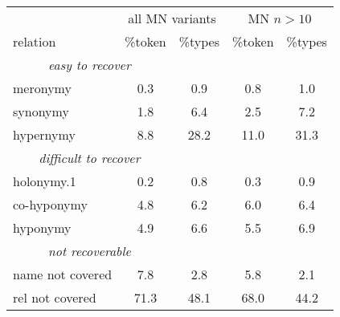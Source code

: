 \begin{table}
\small
\begin{tabular}{lcc|cc}
\toprule
 & \multicolumn{2}{c}{all MN variants} &  \multicolumn{2}{c}{MN $n > 10$} \\
        relation & \%token &    \%types & \%token &    \%types \\
\midrule
\multicolumn{2}{c}{\it easy to recover}\\
 meronymy &  0.3 &  0.9 &  0.8 &  1.0 \\
 synonymy &  1.8 &  6.4 &  2.5 &  7.2 \\
 hypernymy &  8.8 &  28.2 &  11.0 &  31.3 \\
\midrule
\multicolumn{2}{c}{\it difficult to recover}\\
holonymy.1 &  0.2 &  0.8 &  0.3 &  0.9 \\
 co-hyponymy &  4.8 &  6.2 &  6.0 &  6.4 \\
 hyponymy &  4.9 &  6.6 &  5.5 &  6.9 \\
 \midrule
 \multicolumn{2}{c}{\it not recoverable}\\
 name not covered &  7.8 &  2.8 &  5.8 &  2.1 \\
 rel not covered &  71.3 &  48.1 &  68.0 &  44.2 \\
\bottomrule

\end{tabular}


\end{table}
